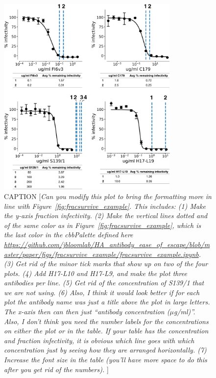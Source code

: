 \documentclass[11pt]{article}
\newcommand{\comment}[1]{{\color{red}[\textsl{#1}]}}
\begin{document}
\begin{figure}
\centerline{\includegraphics[width=0.8\textwidth]{figs/neutralization_curves/WT_neutralization_curves.pdf}}
\caption{\label{fig:neutcurves}
CAPTION
\comment{Can you modify this plot to bring the formatting more in line with Figure~\ref{fig:fracsurvive_example}. 
This includes:
(1) Make the y-axis \emph{fraction infectivity}.
(2) Make the vertical lines dotted and of the same color as in Figure~\ref{fig:fracsurvive_example}, which is the last color in the \emph{cbbPalette} defined here \url{https://github.com/jbloomlab/HA_antibody_ease_of_escape/blob/master/paper/figs/fracsurvive_example/fracsurvive_example.ipynb}. 
(3) Get rid of the minor tick marks that show up on two of the four plots.
(4) Add H17-L10 and H17-L9, and make the plot three antibodies per line.
(5) Get rid of the concentration of S139/1 that we are not using.
(6) Also, I think it would look better if for each plot the antibody name was just a title above the plot in large letters. The x-axis then can then just ``antibody concentration ($\mu$g/ml)''. Also, I don't think you need the number labels for the concentrations on either the plot or in the table. If your table has the concentration and fraction infectivity, it is obvious which line goes with which concentration just by seeing how they are arranged horizontally.
(7) Increase the font size in the table (you'll have more space to do this after you get rid of the numbers).
}
}
\end{figure}
\end{document}
